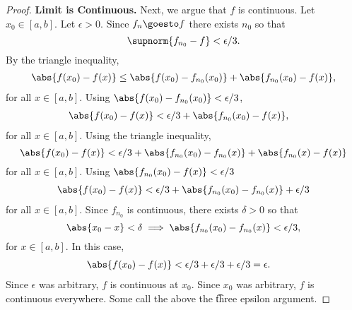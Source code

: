 \begin{proof}
\textbf{Limit is Continuous.}
Next, we argue that $f$ is continuous.
Let $x_0 \in [a, b]$.
Let $\epsilon  > 0$.
Since $f_n \goesto f$ there exists
$n_0$ so that
\[
\supnorm{f_{n_0} - f} < \epsilon /3.
\]
By the triangle inequality,
\[
\begin{aligned}
\abs{f(x_0) - f(x)} \leq \abs{f(x_0) - f_{n_0}(x_0)} + \abs{f_{n_0}(x_0) - f(x)},
\end{aligned}
\]
for all $x \in [a, b]$.
Using $\abs{f(x_0) - f_{n_0}(x_0)} < \epsilon /3$,
\[
\begin{aligned}
\abs{f(x_0) - f(x)} &< \epsilon /3 + \abs{f_{n_0}(x_0) - f(x)},
\end{aligned}
\]
for all $x \in [a, b]$.
Using the triangle inequality,
\[
\abs{f(x_0) - f(x)} < \epsilon /3 + \abs{f_{n_0}(x_0) - f_{n_0}(x)} + \abs{f_{n_0}(x) - f(x)} \\
\]
for all $x \in [a, b]$.
Using $\abs{f_{n_0}(x_0) - f(x)} < \epsilon /3$
\[
\begin{aligned}
\abs{f(x_0) - f(x)} < \epsilon /3 + \abs{f_{n_0}(x_0) - f_{n_0}(x)} + \epsilon /3 \\
\end{aligned}
\]
for all $x \in [a, b]$.
Since $f_{n_0}$ is continuous, there exists $\delta  > 0$ so that
\[
\abs{x_0 - x} < \delta
\implies
\abs{f_{n_0}(x_0) - f_{n_0}(x)} < \epsilon /3,
\]
for $x \in [a, b]$.
In this case,
\[
\begin{aligned}
\abs{f(x_0) - f(x)} &< \epsilon /3 + \epsilon /3 + \epsilon /3 = \epsilon .
\end{aligned}
\]
Since $\epsilon $ was arbitrary, $f$ is continuous at $x_0$.
Since $x_0$ was arbitrary, $f$ is continuous everywhere.
Some call the above the \t{three epsilon argument}.
\end{proof}
